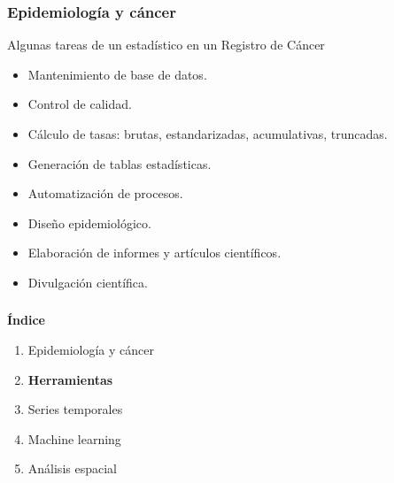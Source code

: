 \documentclass{beamer}
\begin{document}
\begin{frame}\frametitle{Epidemiología y cáncer}
	\begin{block}{Algunas tareas de un estadístico en un Registro de Cáncer}
		\begin{itemize}
			\item Mantenimiento de base de datos.
			\item Control de calidad.
			\item Cálculo de tasas: brutas, estandarizadas, acumulativas, truncadas.
			\item Generación de tablas estadísticas.
			\item Automatización de procesos.
			\item Diseño epidemiológico.
			\item Elaboración de informes y artículos científicos.
			\item Divulgación científica.
		\end{itemize}
	\end{block}	
\end{frame}


\begin{frame}\frametitle{}
	\Large{\textbf{Índice}}\\[2ex]
	\normalsize
	\begin{enumerate}
		\item Epidemiología y cáncer\\[2ex]
		\item \textbf{Herramientas}\\[2ex]
		\item Series temporales \\[2ex]
		\item Machine learning  \\[2ex]
		\item Análisis espacial \\[2ex]
	\end{enumerate}	
\end{frame}

\end{document}
